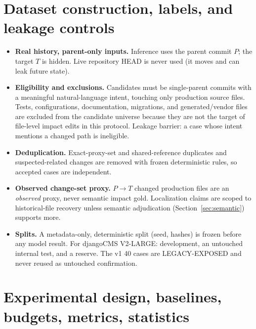\documentclass[11pt,a4paper]{article}
\begin{document}
\section{Dataset construction, labels, and leakage controls}
\label{sec:dataset}

\begin{itemize}
  \item \textbf{Real history, parent-only inputs.} Inference uses the parent
        commit $P$; the target $T$ is hidden. Live repository HEAD is never
        used (it moves and can leak future state).
  \item \textbf{Eligibility and exclusions.} Candidates must be single-parent
        commits with a meaningful natural-language intent, touching only
        production source files. Tests, configurations, documentation,
        migrations, and generated/vendor files are excluded from the candidate
        universe because they are not the target of file-level impact edits in
        this protocol. Leakage barrier: a case whose intent mentions a changed
        path is ineligible.
  \item \textbf{Deduplication.} Exact-proxy-set and shared-reference duplicates
        and suspected-related changes are removed with frozen deterministic
        rules, so accepted cases are independent.
  \item \textbf{Observed change-set proxy.} $P\!\to\!T$ changed production
        files are an \emph{observed} proxy, never semantic impact gold.
        Localization claims are scoped to historical-file recovery unless
        semantic adjudication (Section~\ref{sec:semantic}) supports more.
  \item \textbf{Splits.} A metadata-only, deterministic split (seed, hashes)
        is frozen before any model result. For djangoCMS V2-LARGE: development,
        an untouched internal test, and a reserve. The v1 40 cases are
        LEGACY-EXPOSED and never reused as untouched confirmation.
\end{itemize}

\section{Experimental design, baselines, budgets, metrics, statistics}
\label{sec:design}
\end{document}
